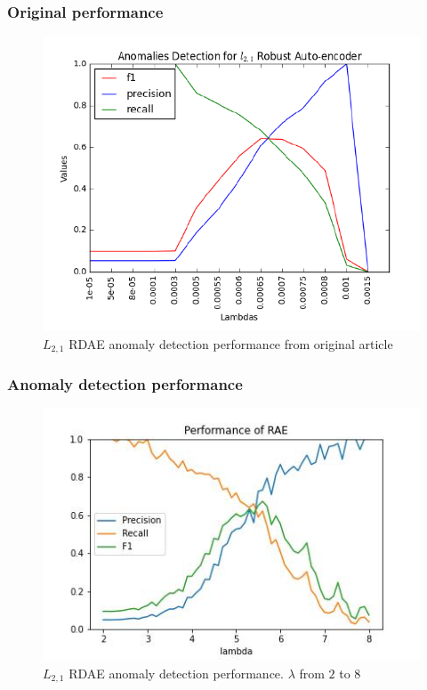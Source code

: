 \documentclass{beamer}
\theoremstyle{plain}
\theoremstyle{definition}
\theoremstyle{remark}
\begin{document}
\begin{frame}
	\frametitle{Original performance}
	\begin{figure}
		\centering
		\includegraphics[width=0.7\linewidth]{Images/l21_perf_article.png}
		\caption[]{$L_{2,1}$ RDAE anomaly detection performance from original article}
	\end{figure}
\end{frame}

\begin{frame}
	\frametitle{Anomaly detection performance}
	\begin{figure}
		\centering
		\includegraphics[width=0.8\linewidth]{Images/l21_experiment_from_0.1_to_10.1.jpg}
		\caption[]{$L_{2,1}$ RDAE anomaly detection performance. $\lambda$ from $2$ to $8$}
	\end{figure}
\end{frame}
\end{document}
